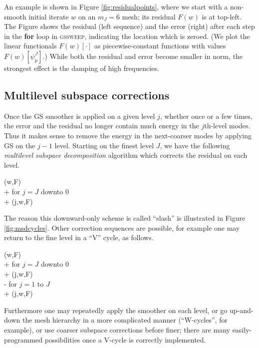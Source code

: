 \documentclass[letterpaper,final,12pt,reqno]{amsart}
\theoremstyle{claim}
\numberwithin{equation}{section}
\numberwithin{figure}{section}
\numberwithin{table}{section}
\numberwithin{theorem}{section}
\begin{document}
An example is shown in Figure \ref{fig:residualpoints}, where we start with a non-smooth initial iterate $w$ on an $m_J=6$ mesh; its residual $F(w)$ is at top-left.  The Figure shows the residual (left sequence) and the error (right) after each step in the \textbf{for} loop in \textsc{gssweep}, indicating the location which is zeroed.  (We plot the linear functionals $F(w)[\cdot]$ as piecewise-constant functions with values $F(w)[\psi_p^J]$.)  While both the residual and error become smaller in norm, the strongest effect is the damping of high frequencies.

\subsection*{Multilevel subspace corrections}  Once the GS smoother is applied on a given level $j$, whether once or a few times, the error and the residual no longer contain much energy in the $j$th-level modes.  Thus it makes sense to remove the energy in the next-coarser modes by applying GS on the $j-1$ level.  Starting on the finest level $J$, we have the following \emph{multilevel subspace decomposition} algorithm which corrects the residual on each level.
\begin{pseudo*}
(w,F)\text{:} \\+
    for $j=J$ downto $0$ \\+
        (j,w,F)
\end{pseudo*}

The reason this downward-only scheme is called ``slash'' is illustrated in Figure \ref{fig:msdcycles}.  Other correction sequences are possible, for example one may return to the fine level in a ``V'' cycle, as follows.
\begin{pseudo*}
(w,F)\text{:} \\+
    for $j=J$ downto $0$ \\+
        (j,w,F) \\-
    for $j=1$ to $J$ \\+
        (j,w,F)
\end{pseudo*}
Furthermore one may repeatedly apply the smoother on each level, or go up-and-down the mesh hierarchy in a more complicated manner (``W-cycles'', for example), or use coarser subspace corrections before finer; there are many easily-programmed possibilities \cite{Briggsetal2000,Trottenbergetal2001} once a V-cycle is correctly implemented.
\end{document}
